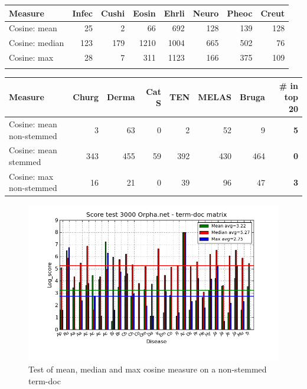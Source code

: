 \begin{table}[H]
  \begin{tiny}
  \label{testResult}
  \begin{tabular}{|l|r|r|r|r|r|r|r|}
    \hline
    Measure &Infec&Cushi&Eosin&Ehrli&Neuro&Pheoc&Creut \\
    \hline
    Cosine: mean & 25 & 2 & 66 & 692 & 128 & 139 & 128 \\
    \hline
    Cosine: median & 123 & 179 & 1210 & 1004 & 665 & 502 & 76 \\
    \hline
    Cosine: max & 28 & 7 & 311 & 1123 & 166 & 375 & 109  \\
    \hline
  \multicolumn{8}{c}{} \\
  \end{tabular}
  \begin{tabular}{|l|r|r|r|r|r|r|r|}
    \hline
    Measure &Churg&Derma&Cat S&TEN&MELAS&Bruga& \scriptsize{\textbf{\# in top 20}} \\
    \hline
    Cosine: mean non-stemmed & 3 & 63 & 0 & 2 & 52 & 9 & \scriptsize{\textbf{5}} \\
    \hline
    Cosine: mean stemmed & 343 & 455 & 59 & 392 & 430 & 464 &  \scriptsize{\textbf{0}}\\
    \hline
    Cosine: max non-stemmed & 16 & 21 & 0 & 39 & 96 & 47 & \scriptsize{\textbf{3}} \\
    \hline
  \end{tabular}
  \end{tiny}
\end{table}

\begin{figure}[H]
        \begin{center}
          \includegraphics[width=1.0\textwidth]{barcharts/termDoc_orphan_hist_3000_ns_mea_med_max_nc.png}
        \end{center}
        \caption{Test of mean, median and max cosine measure on a non-stemmed term-doc}
        \label{termDoc_orphan_hist_3000_ns_mea_med_max_nc}
\end{figure}

